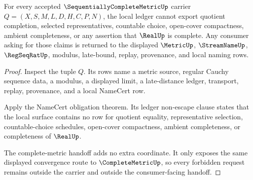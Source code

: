 \begin{theorem}
\label{thm:sequentially-complete-metric-nonescape}
For every accepted $\SequentiallyCompleteMetricUp$ carrier $Q=(X,S,M,L,D,H,C,P,N)$, the local ledger cannot export quotient completion, selected representatives, countable choice, open-cover compactness, ambient completeness, or any assertion that $\RealUp$ is complete. Any consumer asking for those claims is returned to the displayed $\MetricUp$, $\StreamNameUp$, $\RegSeqRatUp$, modulus, late-bound, replay, provenance, and local naming rows.
\end{theorem}
\begin{proof}
Inspect the tuple $Q$. Its rows name a metric source, regular Cauchy sequence data, a modulus, a displayed limit, a late-distance ledger, transport, replay, provenance, and a local NameCert row.

Apply the NameCert obligation theorem. Its ledger non-escape clause states that the local surface contains no row for quotient equality, representative selection, countable-choice schedules, open-cover compactness, ambient completeness, or completeness of $\RealUp$.

The complete-metric handoff adds no extra coordinate. It only exposes the same displayed convergence route to $\CompleteMetricUp$, so every forbidden request remains outside the carrier and outside the consumer-facing handoff.
\end{proof}


